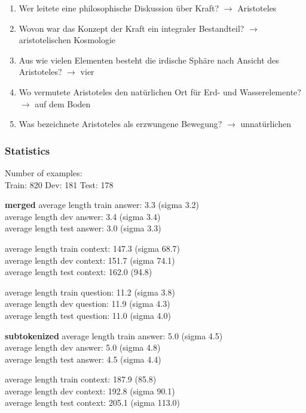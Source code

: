 \begin{enumerate}
  \item Wer leitete eine philosophische Diskussion über Kraft? $\rightarrow$ Aristoteles
  \item Wovon war das Konzept der Kraft ein integraler Bestandteil? $\rightarrow$ aristotelischen Kosmologie
  \item Aus wie vielen Elementen besteht die irdische Sphäre nach Ansicht des Aristoteles? $\rightarrow$ vier
  \item Wo vermutete Aristoteles den natürlichen Ort für Erd- und Wasserelemente? $\rightarrow$ auf dem Boden
  \item Was bezeichnete Aristoteles als erzwungene Bewegung? $\rightarrow$ unnatürlichen
\end{enumerate}

\cite{artetxe2019cross}

\subsubsection{Statistics}

Number of examples: \\
Train: 820
Dev: 181
Test: 178

\textbf{merged}
average length train answer: 3.3 (sigma 3.2) \\
average length dev answer: 3.4 (sigma 3.4) \\
average length test answer: 3.0 (sigma 3.3)

average length train context: 147.3 (sigma 68.7) \\
average length dev context: 151.7 (sigma 74.1) \\
average length test context: 162.0 (94.8)

average length train question: 11.2 (sigma 3.8) \\
average length dev question: 11.9 (sigma 4.3) \\
average length test question: 11.0 (sigma 4.0)

\textbf{subtokenized}
average length train answer: 5.0 (sigma 4.5) \\
average length dev answer: 5.0 (sigma 4.8) \\
average length test answer: 4.5 (sigma 4.4)

average length train context: 187.9 (85.8) \\
average length dev context: 192.8 (sigma 90.1) \\
average length test context: 205.1 (sigma 113.0)

